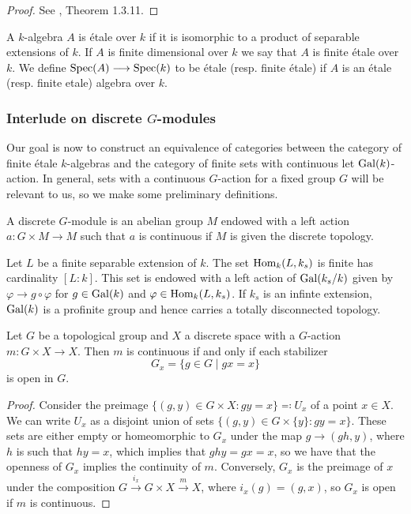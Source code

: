 \begin{proof}
	See \cite{Szamuely}, Theorem 1.3.11.
\end{proof}

\begin{definition}
	A $k$-algebra $A$ is \'etale over $k$ if it is isomorphic to a product of separable extensions of $k$. If $A$ is finite dimensional over $k$ we say that $A$ is finite \'etale over $k$. We define $\operatorname{Spec}(A) \longrightarrow \operatorname{Spec}(k)$ to be \'etale (resp. finite \'etale) if $A$ is an \'etale  (resp. finite \;etale) algebra over $k$.
\end{definition}

\subsubsection{Interlude on discrete $G$-modules}

Our goal is now to construct an equivalence of categories between the category of finite \'etale $k$-algebras and the category of finite sets with continuous let $\operatorname{Gal}(k)$-action. In general, sets with a continuous $G$-action for a fixed group $G$ will be relevant to us, so we make some preliminary definitions.

\begin{definition}
	A discrete $G$-module is an abelian group $M$ endowed with a left action $a: G \times M \to M$ such that $a$ is continuous if $M$ is given the discrete topology.
\end{definition}

\begin{example}
	Let	$L$ be a finite separable extension of $k$. The set $\operatorname{Hom}_k(L, k_s)$ is finite has cardinality $[L:k]$. This set is endowed with a left action of $\operatorname{Gal}(k_s/k)$ given by $\varphi \to g \circ \varphi$ for $g \in \operatorname{Gal}(k)$ and $\varphi \in \operatorname{Hom}_k(L, k_s)$. If $k_s$ is an infinte extension, $\operatorname{Gal}(k)$ is a profinite group and hence carries a totally disconnected topology.
\end{example}

\begin{lemma}\label{lemma:stabilizer}
	Let $G$ be a topological group and $X$ a discrete space with a $G$-action $m \colon G \times X \to X$. Then $m$ is continuous if and only if each stabilizer
	\[
		G_x = \{ g \in G \mid gx = x \}
	\]
	is open in $G$.
\end{lemma}

\begin{proof}
	Consider the preimage $\{ (g,y) \in G \times X \colon gy = x\} \eqqcolon U_x$ of a point $x \in X$. We can write $U_x$ as a disjoint union of sets $\{(g,y) \in G \times \{y\} \colon gy = x\}$. These sets are either empty or homeomorphic to $G_x$ under the map $g \to (gh, y)$, where $h$ is such that $hy = x$, which implies that $ghy = gx = x$, so we have that the openness of $G_x$ implies the continuity of $m$. Conversely, $G_x$ is the preimage of $x$ under the composition $G \xrightarrow{i_x} G \times X \xrightarrow{m} X$, where $i_x(g) = (g,x)$, so $G_x$ is open if $m$ is continuous.
\end{proof}


